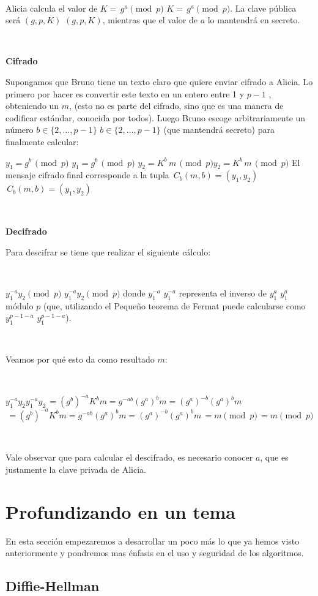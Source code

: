 \documentclass[11pt, conference]{IEEEtran}
\begin{document}
\

Alicia calcula el valor de $K=\,g^{a}{\pmod {p}}$ $K=\,g^{a}{\pmod {p}}$. La clave pública será $(g,p,K)$ $(g,p,K)$, mientras que el valor de $a$ lo mantendrá en secreto.


\

\textbf{Cifrado}

Supongamos que Bruno tiene un texto claro que quiere enviar cifrado a Alicia. Lo primero por hacer es convertir este texto en un entero entre 1 y $p-1$ , obteniendo un $m$, (esto no es parte del cifrado, sino que es una manera de codificar estándar, conocida por todos). Luego Bruno escoge arbitrariamente un número $ b\in \{2,\ldots ,p-1\}$ $b\in \{2,\ldots ,p-1\}$ (que mantendrá secreto) para finalmente calcular:

$y_{1}=g^{b}\,{\pmod {p}}$ $y_{1}=g^{b}\,{\pmod {p}}$
$ y_{2}=K^{b}\,m\,{\pmod {p}}$$y_{2}=K^{b}\,m\,{\pmod {p}}$
El mensaje cifrado final corresponde a la tupla $ \,C_{b}(m,b)=(y_{1},y_{2})$ $ \,C_{b}(m,b)=(y_{1},y_{2})$


\

\textbf{Decifrado}

Para descifrar se tiene que realizar el siguiente cálculo:

\

$y_{1}^{-a}y_{2}{\pmod {p}}$ $ y_{1}^{-a}y_{2}{\pmod {p}}$
donde $ y_{1}^{-a}$ $ y_{1}^{-a}$ representa el inverso de $y_{1}^{a}$ $y_{1}^{a}$ módulo $p$ (que, utilizando el Pequeño teorema de Fermat puede calcularse como $y_{1}^{p-1-a}$ $y_{1}^{p-1-a}$).

\

Veamos por qué esto da como resultado $m$:

\

$y_{1}^{-a}y_{2}$$y_{1}^{-a}y_{2}$$ \,=(g^{b})^{-a}K^{b}m=g^{-ab}(g^{a})^{b}m=(g^{a})^{-b}(g^{a})^{b}m$$ \,=(g^{b})^{-a}K^{b}m=g^{-ab}(g^{a})^{b}m=(g^{a})^{-b}(g^{a})^{b}m$$ \,=m{\pmod {p}}$$ \,=m{\pmod {p}}$

\

Vale observar que para calcular el descifrado, es necesario conocer $a$, que es justamente la clave privada de Alicia.

\section{Profundizando en un tema}
En esta sección empezaremos a desarrollar un poco más lo que ya hemos visto anteriormente y pondremos mas énfasis en el uso y seguridad de los algoritmos.  
\subsection{\bf Diffie-Hellman}
\end{document}
